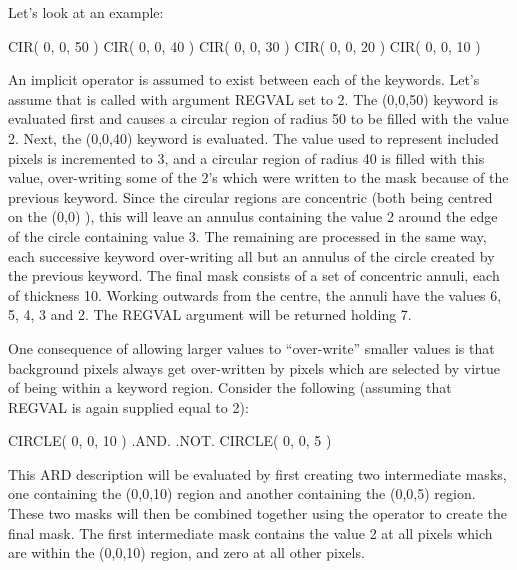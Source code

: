 \documentclass[11pt]{starlink}
\begin{document}
Let's look at an example:

\small
\begin{terminalv}
      CIR( 0, 0, 50 )
      CIR( 0, 0, 40 )
      CIR( 0, 0, 30 )
      CIR( 0, 0, 20 )
      CIR( 0, 0, 10 )
\end{terminalv}
\normalsize

An implicit  operator is assumed to exist between each of the 
keywords. Let's assume that  is called with argument REGVAL set to
2. The (0,0,50) keyword is evaluated first and causes a circular region
of radius 50 to be filled with the value 2. Next, the (0,0,40) keyword is
evaluated. The value used to represent included pixels is incremented to 3, and
a circular region of radius 40 is filled with this value, over-writing some of
the 2's which were written to the mask because of the previous keyword. Since
the circular regions are concentric (both being centred on the (0,0) ), this
will leave an annulus containing the value 2 around the edge of the circle
containing value 3. The remaining  are processed in the same way, each
successive keyword over-writing all but an annulus of the circle created by the
previous keyword. The final mask consists of a set of concentric annuli, each of
thickness 10. Working outwards from the centre, the annuli have the values 6, 5,
4, 3 and 2. The REGVAL argument will be returned holding 7.

One consequence of allowing larger values to ``over-write'' smaller values is
that background pixels always get over-written by pixels which are selected by
virtue of being within a keyword region. Consider the following (assuming that
REGVAL is again supplied equal to 2):

\small
\begin{terminalv}
      CIRCLE( 0, 0, 10 ) .AND. .NOT. CIRCLE( 0, 0, 5 )
\end{terminalv}
\normalsize

This ARD description will be evaluated by first creating two intermediate masks,
one containing the (0,0,10) region and another containing the
(0,0,5) region. These two masks will then be combined together using
the  operator to create the final mask. The first intermediate mask
contains the value 2 at all pixels which are within the (0,0,10) region,
and zero at all other pixels.
\end{document}
